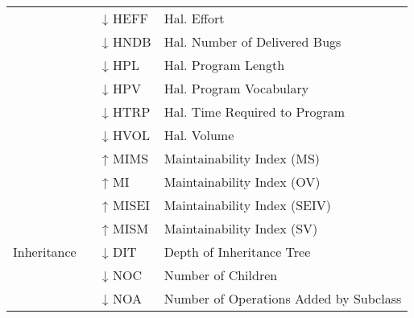 \begin{table}
\begin{threeparttable}
\begin{adjustbox}{width=1.0\textwidth,center}
\begin{tabular}{llll}
             & \cellcolor{gray!30}\cite{islam2018characteristics} & \cellcolor{gray!30}↓ HEFF & \cellcolor{gray!30}Hal. Effort  \\
              & \cite{islam2018characteristics} & ↓ HNDB & Hal. Number of Delivered Bugs   \\
               & \cellcolor{gray!30}\cite{islam2018characteristics} &\cellcolor{gray!30}↓ HPL & \cellcolor{gray!30}Hal. Program Length   \\
                & \cite{islam2018characteristics} & ↓ HPV & Hal. Program Vocabulary  \\
                 & \cellcolor{gray!30}\cite{islam2018characteristics} & \cellcolor{gray!30}↓ HTRP &\cellcolor{gray!30}Hal. Time Required to Program  \\
                  & \cite{islam2018characteristics} & ↓ HVOL &Hal. Volume \\
                   & \cellcolor{gray!30}\cite{islam2018characteristics} &\cellcolor{gray!30}↑ MIMS & \cellcolor{gray!30}Maintainability Index (MS) \\
                    & \cite{islam2018characteristics} &↑ MI& Maintainability Index (OV) \\
                     & \cellcolor{gray!30}\cite{islam2018characteristics} &\cellcolor{gray!30}↑ MISEI& \cellcolor{gray!30}Maintainability Index (SEIV) \\
                      & \cite{islam2018characteristics} &↑ MISM&  Maintainability Index (SV)\\
Inheritance & \cellcolor{gray!30}\cite{chavez2017does,singh2012evaluation} & \cellcolor{gray!30}↓ DIT &\cellcolor{gray!30}Depth of Inheritance Tree 
  \\
   & \cite{chavez2017does,singh2012evaluation} & ↓ NOC &Number of Children   \\
 & \cellcolor{gray!30}\cite{bavota2015experimental} & \cellcolor{gray!30}↓ NOA & \cellcolor{gray!30}Number of Operations Added by Subclass   \\
        

\end{tabular}
\end{adjustbox}
\end{threeparttable}
\end{table}
